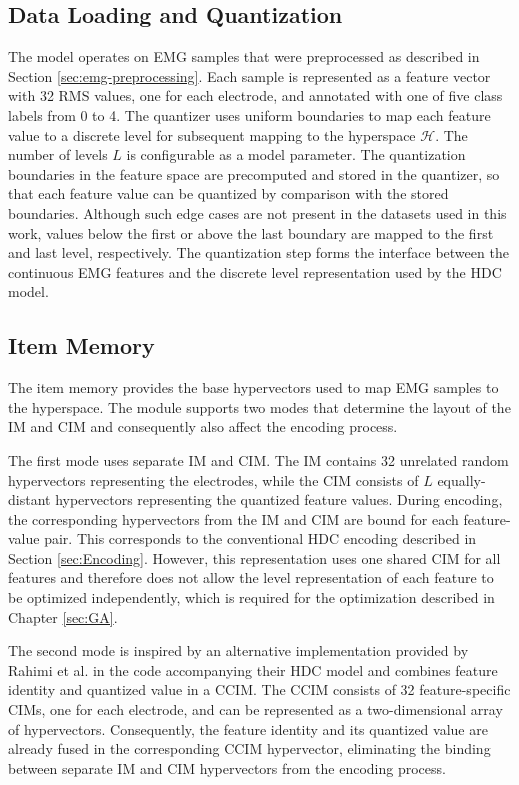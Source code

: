         \subsection{Data Loading and Quantization}

        The model operates on EMG samples that were preprocessed as described in Section \ref{sec:emg-preprocessing}. Each sample is represented as a feature vector with 32 RMS values, one for each electrode, and annotated with one of five class labels from 0 to 4. The quantizer uses uniform boundaries to map each feature value to a discrete level for subsequent mapping to the hyperspace $\mathcal{H}$. The number of levels $L$ is configurable as a model parameter. The quantization boundaries in the feature space are precomputed and stored in the quantizer, so that each feature value can be quantized by comparison with the stored boundaries. Although such edge cases are not present in the datasets used in this work, values below the first or above the last boundary are mapped to the first and last level, respectively. The quantization step forms the interface between the continuous EMG features and the discrete level representation used by the HDC model.

        
        \subsection{Item Memory}
        \label{sec:baseline_item_memory}
        The item memory provides the base hypervectors used to map EMG samples to the hyperspace. The module supports two modes that determine the layout of the \ac{IM} and \ac{CIM} and consequently also affect the encoding process.

        The first mode uses separate \ac{IM} and \ac{CIM}. The \ac{IM} contains 32 unrelated random hypervectors representing the electrodes, while the \ac{CIM} consists of $L$  equally-distant hypervectors representing the quantized feature values. During encoding, the corresponding hypervectors from the \ac{IM} and \ac{CIM} are bound for each feature-value pair. This corresponds to the conventional HDC encoding described in Section \ref{sec:Encoding}. However, this representation uses one shared CIM for all features and therefore does not allow the level representation of each feature to be optimized independently, which is required for the optimization described in Chapter \ref{sec:GA}.

        The second mode is inspired by an alternative implementation provided by Rahimi et al. in the code accompanying their HDC model \cite{rahimi_hyperdimensional_2016} and combines feature identity and quantized value in a \ac{CCIM}. The \ac{CCIM} consists of 32 feature-specific CIMs, one for each electrode, and can be represented as a two-dimensional array of hypervectors. Consequently, the feature identity and its quantized value are already fused in the corresponding CCIM hypervector, eliminating the binding between separate IM and CIM hypervectors from the encoding process.
        
